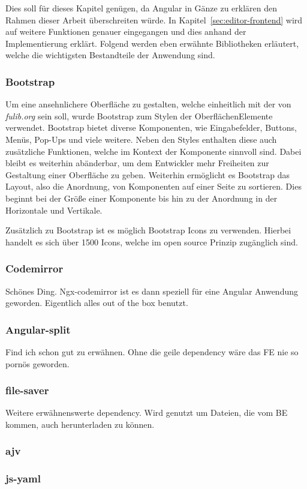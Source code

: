 Dies soll für dieses Kapitel genügen, da Angular in Gänze zu erklären den Rahmen dieser Arbeit überschreiten würde.
In Kapitel~\ref{sec:editor-frontend} wird auf weitere Funktionen genauer eingegangen und dies anhand der Implementierung erklärt.
Folgend werden eben erwähnte Bibliotheken erläutert, welche die wichtigsten Bestandteile der Anwendung sind.

\subsubsection{Bootstrap}
Um eine ansehnlichere Oberfläche zu gestalten, welche einheitlich mit der von \textit{fulib.org} sein soll, wurde Bootstrap zum
Stylen der OberflächenElemente verwendet.
Bootstrap bietet diverse Komponenten, wie Eingabefelder, Buttons, Menüs, Pop-Ups und viele weitere.
Neben den Styles enthalten diese auch zusätzliche Funktionen, welche im Kontext der Komponente sinnvoll sind.
Dabei bleibt es weiterhin abänderbar, um dem Entwickler mehr Freiheiten zur Gestaltung einer Oberfläche zu geben.
Weiterhin ermöglicht es Bootstrap das Layout, also die Anordnung, von Komponenten auf einer Seite zu sortieren.
Dies beginnt bei der Größe einer Komponente bis hin zu der Anordnung in der Horizontale und Vertikale.\cite*{bs}

Zusätzlich zu Bootstrap ist es möglich Bootstrap Icons zu verwenden.
Hierbei handelt es sich über 1500 Icons, welche im open source Prinzip zugänglich sind.\cite*{bsIcons}

\subsubsection{Codemirror}
\todo
Schönes Ding.
Ngx-codemirror ist es dann speziell für eine Angular Anwendung geworden.
Eigentlich alles out of the box benutzt.

\subsubsection{Angular-split}
\todo
Find ich schon gut zu erwähnen.
Ohne die geile dependency wäre das FE nie so pornös geworden.

\subsubsection{file-saver}
\todo
Weitere erwähnenswerte dependency.
Wird genutzt um Dateien, die vom BE kommen, auch herunterladen zu können.

\subsubsection{ajv}
\todo

\subsubsection{js-yaml}
\todo
